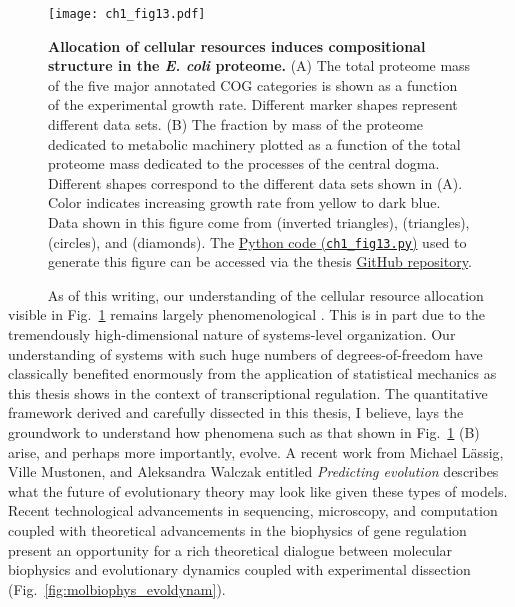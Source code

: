 \documentclass[12pt]{caltech_thesis}
\begin{document}
\hypertarget{fig:proteomics}{%
\begin{figure}
\centering
\texttt{[image: ch1\_fig13.pdf]}
\caption[{Allocation of cellular resources induces compositional
structure in the \emph{E. coli} proteome.}]{\textbf{Allocation of
cellular resources induces compositional structure in the \emph{E. coli}
proteome.} (A) The total proteome mass of the five major annotated COG
categories is shown as a function of the experimental growth rate.
Different marker shapes represent different data sets. (B) The fraction
by mass of the proteome dedicated to metabolic machinery plotted as a
function of the total proteome mass dedicated to the processes of the
central dogma. Different shapes correspond to the different data sets
shown in (A). Color indicates increasing growth rate from yellow to dark
blue. Data shown in this figure come from \textcite{peebo2015} (inverted
triangles), \textcite{li2014} (triangles), \textcite{schmidt2016}
(circles), and \textcite{valgepea2013} (diamonds). The
\href{https://github.com/gchure/phd/blob/master/src/chapter_01/code/ch1_fig13.py}{Python
code (\texttt{ch1\_fig13.py})} used to generate this figure can be
accessed via the thesis \href{https://github.com/gchure/phd}{GitHub
repository}.}
\label{fig:proteomics}
\end{figure}
}

~~~~~ As of this writing, our understanding of the cellular resource
allocation visible in Fig.~\ref{fig:proteomics} remains largely
phenomenological \autocite{scott2014}. This is in part due to the
tremendously high-dimensional nature of systems-level organization. Our
understanding of systems with such huge numbers of degrees-of-freedom
have classically benefited enormously from the application of
statistical mechanics as this thesis shows in the context of
transcriptional regulation. The quantitative framework derived and
carefully dissected in this thesis, I believe, lays the groundwork to
understand how phenomena such as that shown in Fig.~\ref{fig:proteomics}
(B) arise, and perhaps more importantly, evolve. A recent work from
Michael Lässig, Ville Mustonen, and Aleksandra Walczak entitled
\emph{Predicting evolution} \autocite{lassig2017} describes what the
future of evolutionary theory may look like given these types of models.
Recent technological advancements in sequencing, microscopy, and
computation coupled with theoretical advancements in the biophysics of
gene regulation present an opportunity for a rich theoretical dialogue
between molecular biophysics and evolutionary dynamics coupled with
experimental dissection (Fig.~\ref{fig:molbiophys_evoldynam}).
\end{document}
